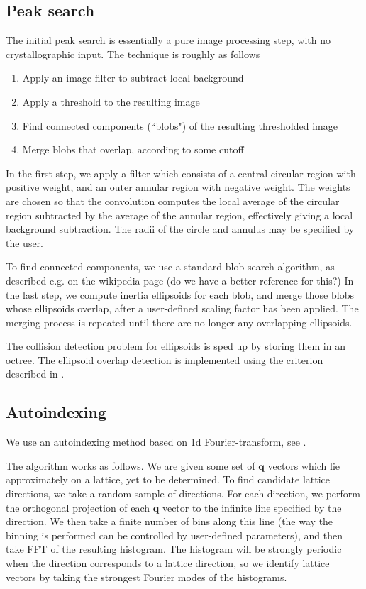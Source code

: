 \documentclass[twocolumn,preprintnumbers,amsmath,amssymb]{revtex4}
\newcommand{\bq}{\mathbf{q}}
\begin{document}
\subsection{Peak search} \label{peak-search}
The initial peak search is essentially a pure image processing step, with no crystallographic
input. The technique is roughly as follows
\begin{enumerate}
  \item Apply an image filter to subtract local background
  \item Apply a threshold to the resulting image
  \item Find connected components (``blobs") of the resulting thresholded image
  \item Merge blobs that overlap, according to some cutoff
\end{enumerate}

In the first step, we apply a filter which consists of a central circular region with positive weight,
and an outer annular region with negative weight. The weights are chosen so that the convolution
computes the local average of the circular region subtracted by the average of the annular region,
effectively giving a local background subtraction. The radii of the circle and annulus may be
specified by the user.

To find connected components, we use a standard blob-search algorithm, as described e.g. on the
wikipedia page (do we have a better reference for this?) In the last step, we compute inertia
ellipsoids for each blob, and merge those blobs whose ellipsoids overlap, after a user-defined
scaling factor has been applied. The merging process is repeated until there are no longer any
overlapping ellipsoids.

The collision detection problem for ellipsoids is sped up by storing them in an octree. The
ellipsoid overlap detection is implemented using the criterion described in \cite{ellipsoid-collision}.


\subsection{Autoindexing} \label{autoindex}
We use an autoindexing method based on 1d Fourier-transform, see \cite{fft1, fft2}.

The algorithm works as follows. We are given some set of $\bq$ vectors which lie approximately on
a lattice, yet to be determined. To find candidate lattice directions, we take a random sample of
directions. For each direction, we perform the orthogonal projection of each $\bq$ vector to the
infinite line specified by the direction. We then take a finite number of bins along this line
(the way the binning is performed can be controlled by user-defined parameters), and then take
FFT of the resulting histogram. The histogram will be strongly periodic when the direction corresponds
to a lattice direction, so we identify lattice vectors by taking the strongest Fourier modes of
the histograms.
\end{document}
